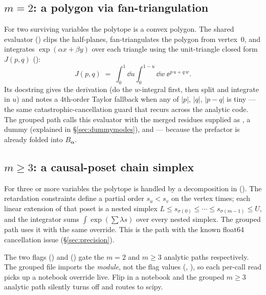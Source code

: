 \subsection{$m=2$: a polygon via fan-triangulation}

For two surviving variables the polytope is a convex polygon. The shared
evaluator  ()
clips the half-planes, fan-triangulates the polygon from vertex~$0$, and
integrates $\exp(\alpha x + \beta y)$ over each triangle using the unit-triangle
closed form $J(p,q)$ ():
\begin{equation}
  J(p,q) \;=\; \int_0^1\!\dd u \int_0^{1-u}\!\dd w\ \ee^{p\,u + q\,w} .
  \label{eq:J}
\end{equation}
Its docstring gives the derivation (do the $w$-integral first, then split and
integrate in $u$) and notes a 4th-order Taylor fallback when any of $|p|$, $|q|$,
$|p-q|$ is tiny --- the same catastrophic-cancellation guard that recurs across
the analytic code. The grouped path calls this evaluator with the merged residues
supplied as , a dummy
 (explained in
\S\ref{sec:dummymodes}), and  --- because the
prefactor is already folded into $B_{\bm\alpha}$.

\subsection{$m\ge 3$: a causal-poset chain simplex}

For three or more variables the polytope is handled by a  decomposition in 
(). The retardation constraints define a partial
order $s_u < s_v$ on the vertex times; each linear extension of that poset is a
nested simplex $L \le s_{\sigma(0)} \le \cdots \le s_{\sigma(m-1)} \le U$, and the
integrator sums $\int \exp(\sum \lambda s)$ over every nested simplex. The grouped
path uses it with the same  override. This is the path with the
known float64 cancellation issue (\S\ref{sec:precision}).

\begin{note}
The two flags 
() and 
() gate the $m=2$ and $m\ge 3$ analytic paths
respectively. The grouped file imports the \emph{module}, not the flag values
(, ),
so each per-call read picks up a notebook override live. Flip
 in a notebook and the grouped
$m\ge 3$ analytic path silently turns off and routes to scipy.
\end{note}

